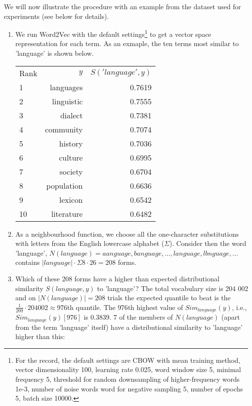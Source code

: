 \documentclass{sig-alternate}
\begin{document}
We will now illustrate the procedure with an example from the dataset
used for experiments (see below for details).

\begin{enumerate}
\item We run Word2Vec with the default settings\footnote{For the record, the default settings are CBOW with mean training method, vector dimensionality 100, learning rate 0.025, word window size 5, minimal frequency 5, threshold for random downsampling of higher-frequency words 1e-3, number of noise words word for negative sampling 5, number of epochs 5, batch size 10000.} to get a vector space representation for each term. As an exmaple, the ten terms most similar to
'language' is shown below.

  \begin{tabular}{l|r r}
    Rank & $y$ & $S('language', y)$\\
1 & languages & 0.7619\\\hline
2 & linguistic & 0.7555\\
3 & dialect & 0.7381\\
4 & community & 0.7074\\
5 & history & 0.7036\\
6 & culture & 0.6995\\
7 & society & 0.6704\\
8 & population & 0.6636\\
9 & lexicon & 0.6542\\
10 & literature & 0.6482\\
\end{tabular}

\item As a neighbourhood function, we choose all the one-character substitutions with letters from the English lowercase alphabet ($\Sigma$). Consider then the word 'language', $N(language) = {aanguage, banguage, \ldots{}, language, lbnguage, \ldots{}}$ contains $|language| \cdot \Sigma 8 \cdot 26 = 208$ forms.

\item Which of these 208 forms have a higher than expected
  distributional similarity $S(language, y)$ to 'language'? The total
  vocabulary size is 204 002 and on $|N(language)| = 208$ trials the
  expected quantile to beat is the $\frac{1}{209} \cdot 204002 \approx
  976$th quantile. The $976$th highest value of $Sim_{language}(y)$,
  i.e., $Sim_{language}(y)[976]$ is $0.3839$. 7 of the members of $N(language)$
  (apart from the term 'language' itself) have a distributional similarity
  to 'language' higher than this:


\end{enumerate}
\end{document}
